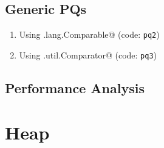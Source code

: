 \documentclass[12pt,a4paper]{article}
\begin{document}
\subsection{Generic PQs}
\begin{enumerate}
	\item Using \lstinline@java.lang.Comparable@ (code: \texttt{pq2})
	\item Using \lstinline@java.util.Comparator@ (code: \texttt{pq3})
\end{enumerate}
\subsection{Performance Analysis}

\section{Heap}
\end{document}
